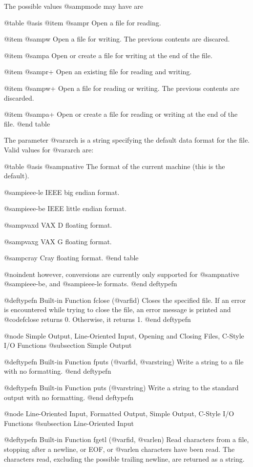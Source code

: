 The possible values @samp{mode} may have are

@table @asis
@item @samp{r}
Open a file for reading.

@item @samp{w}
Open a file for writing.  The previous contents are discared.

@item @samp{a}
Open or create a file for writing at the end of the file.

@item @samp{r+}
Open an existing file for reading and writing.

@item @samp{w+}
Open a file for reading or writing.  The previous contents are
discarded.

@item @samp{a+}
Open or create a file for reading or writing at the end of the
file.
@end table

The parameter @var{arch} is a string specifying the default data format
for the file.  Valid values for @var{arch} are:

@table @asis
@samp{native}
The format of the current machine (this is the default).

@samp{ieee-le}
IEEE big endian format.

@samp{ieee-be}
IEEE little endian format.

@samp{vaxd}
VAX D floating format.

@samp{vaxg}
VAX G floating format.

@samp{cray}
Cray floating format.
@end table

@noindent
however, conversions are currently only supported for @samp{native}
@samp{ieee-be}, and @samp{ieee-le} formats.
@end deftypefn

@deftypefn {Built-in Function} {} fclose (@var{fid})
Closes the specified file.  If an error is encountered while trying to
close the file, an error message is printed and @code{fclose} returns
0.  Otherwise, it returns 1.
@end deftypefn

@node Simple Output, Line-Oriented Input, Opening and Closing Files, C-Style I/O Functions
@subsection Simple Output

@deftypefn {Built-in Function} {} fputs (@var{fid}, @var{string})
Write a string to a file with no formatting.
@end deftypefn

@deftypefn {Built-in Function} {} puts (@var{string})
Write a string to the standard output with no formatting.
@end deftypefn

@node Line-Oriented Input, Formatted Output, Simple Output, C-Style I/O Functions
@subsection Line-Oriented Input

@deftypefn {Built-in Function} {} fgetl (@var{fid}, @var{len})
Read characters from a file, stopping after a newline, or EOF,
or @var{len} characters have been read.  The characters read, excluding
the possible trailing newline, are returned as a string.

